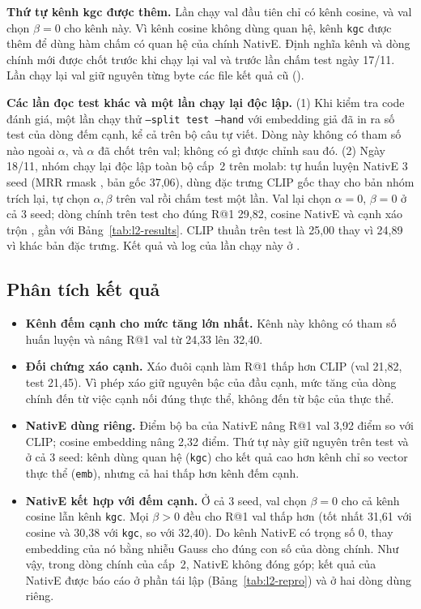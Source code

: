 \textbf{Thứ tự kênh kgc được thêm.} Lần chạy val đầu tiên chỉ có kênh cosine, và val chọn $\beta = 0$ cho kênh này. Vì kênh
cosine không dùng quan hệ, kênh \texttt{kgc} được thêm để dùng hàm chấm có quan hệ của chính NativE. Định
nghĩa kênh và dòng chính mới được chốt trước khi chạy lại val và trước lần chấm test ngày 17/11. Lần chạy lại val giữ
nguyên từng byte các file kết quả cũ ().

\textbf{Các lần đọc test khác và một lần chạy lại độc lập.} (1) Khi kiểm tra code đánh giá,
một lần chạy thử \texttt{--split test --hand} với embedding giả đã in ra số test của dòng đếm cạnh, kể cả trên bộ câu tự
viết. Dòng này không có tham số nào ngoài $\alpha$, và $\alpha$ đã chốt trên val; không có gì được chỉnh sau đó.
(2) Ngày 18/11, nhóm chạy lại độc lập toàn bộ cấp~2 trên molab: tự huấn luyện NativE 3 seed (MRR rmask ,
bản gốc 37,06), dùng đặc trưng CLIP gốc thay cho bản nhóm trích lại, tự chọn $\alpha,\beta$ trên val rồi chấm test một lần.
Val lại chọn $\alpha = 0$, $\beta = 0$ ở cả 3 seed; dòng chính trên test cho đúng R@1 29,82, cosine NativE
 và cạnh xáo trộn , gần với Bảng~\ref{tab:l2-results}. CLIP thuần trên test là 25,00
thay vì 24,89 vì khác bản đặc trưng. Kết quả và log của lần chạy này ở .

\subsection{Phân tích kết quả}

\begin{itemize}
\item \textbf{Kênh đếm cạnh cho mức tăng lớn nhất.} Kênh này không có tham số huấn luyện và nâng R@1 val từ 24,33 lên 32,40.
\item \textbf{Đối chứng xáo cạnh.} Xáo đuôi cạnh làm R@1 thấp hơn CLIP (val 21,82, test 21,45). Vì phép xáo giữ nguyên bậc
của đầu cạnh, mức tăng của dòng chính đến từ việc cạnh nối đúng thực thể, không đến từ bậc của thực thể.
\item \textbf{NativE dùng riêng.} Điểm bộ ba của NativE nâng R@1 val 3,92 điểm so với CLIP; cosine embedding nâng 2,32 điểm.
Thứ tự này giữ nguyên trên test và ở cả 3 seed: kênh dùng quan hệ (\texttt{kgc}) cho kết quả cao hơn kênh chỉ so vector thực
thể (\texttt{emb}), nhưng cả hai thấp hơn kênh đếm cạnh.
\item \textbf{NativE kết hợp với đếm cạnh.} Ở cả 3 seed, val chọn $\beta = 0$ cho cả kênh cosine lẫn kênh \texttt{kgc}. Mọi
$\beta > 0$ đều cho R@1 val thấp hơn (tốt nhất 31,61 với cosine và 30,38 với \texttt{kgc}, so với 32,40). Do kênh NativE có
trọng số 0, thay embedding của nó bằng nhiễu Gauss cho đúng con số của dòng chính. Như vậy, trong dòng chính của cấp~2,
NativE không đóng góp; kết quả của NativE được báo cáo ở phần tái lập (Bảng~\ref{tab:l2-repro}) và ở hai dòng dùng riêng.
\end{itemize}

